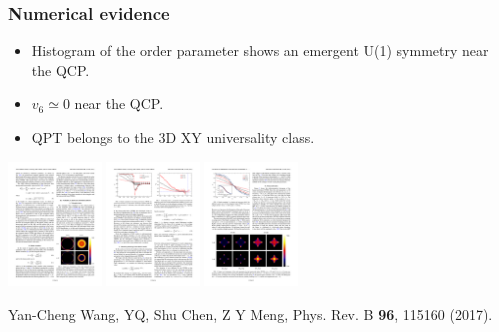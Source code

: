 \documentclass[xcolor=table, aspectratio=1610,ignorenonframetext]{beamer}
\begin{document}
\begin{frame}
  \frametitle{Numerical evidence}
  \begin{itemize}
    \item Histogram of the order parameter shows an emergent U(1) symmetry near the QCP.
    \item $v_6\simeq0$ near the QCP.
    \item QPT belongs to the 3D XY universality class.
  \end{itemize}
  \begin{center}
    \includegraphics[height=3.3cm]{histogram}
    \includegraphics[height=3.3cm]{v6}
    \includegraphics[height=3.3cm]{xy-class}
  \end{center}
  {\footnotesize Yan-Cheng Wang, YQ, Shu Chen, Z Y Meng, Phys. Rev. B \textbf{96}, 115160 (2017). }
\end{frame}
\end{document}
